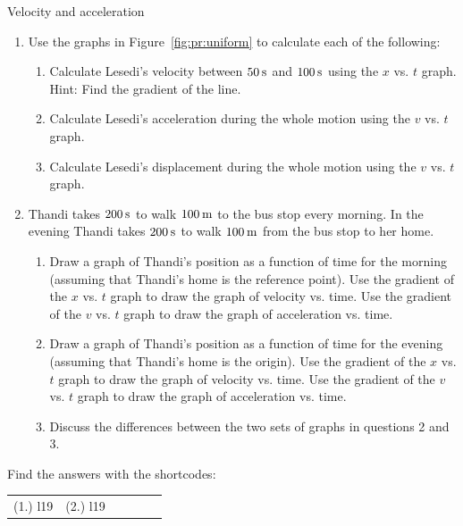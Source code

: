 \begin{exercises}{Velocity and acceleration }
            \nopagebreak \noindent
        \label{m38795*id71023}\begin{enumerate}[noitemsep, label=\textbf{\arabic*}. ] 
            \label{m38795*uid94}\item Use the graphs in Figure~\ref{fig:pr:uniform} to calculate each of the following:
\label{m38795*id71044}\begin{enumerate}[noitemsep, label=\textbf{\alph*}. ] 
            \label{m38795*uid95}\item Calculate Lesedi's velocity between $50\phantom{\rule{2pt}{0ex}}\text{s}$ and $100\phantom{\rule{2pt}{0ex}}\text{s}$ using the $x$ vs. $t$ graph. Hint: Find the gradient of the line.
\label{m38795*uid96}\item Calculate Lesedi's acceleration during the whole motion using the $v$ vs. $t$ graph.
\label{m38795*uid97}\item Calculate Lesedi's displacement during the whole motion using the $v$ vs. $t$ graph.
\end{enumerate}
                \label{m38795*uid98}\item Thandi takes $200\phantom{\rule{2pt}{0ex}}\text{s}$ to walk $100\phantom{\rule{2pt}{0ex}}\text{m}$ to the bus stop every morning. In the evening Thandi takes $200\phantom{\rule{2pt}{0ex}}\text{s}$ to walk $100\phantom{\rule{2pt}{0ex}}\text{m}$ from the bus stop to her home.\label{m38795*id7103444}\begin{enumerate}[noitemsep, label=\textbf{\alph*}. ] 
            \label{m38795*uid9523}\item  Draw a graph of Thandi's position as a function of time for the morning (assuming that Thandi's home is the reference point). Use the gradient of the $x$ vs. $t$ graph to draw the graph of velocity vs. time. Use the gradient of the $v$ vs. $t$ graph to draw the graph of acceleration vs. time.
\label{m38795*uid99}\item  Draw a graph of Thandi's position as a function of time for the evening (assuming that Thandi's home is the origin). Use the gradient of the $x$ vs. $t$ graph to draw the graph of velocity vs. time. Use the gradient of the $v$ vs. $t$ graph to draw the graph of acceleration vs. time.
\label{m38795*uid100}\item Discuss the differences between the two sets of graphs in questions 2 and 3.\end{enumerate}
        \end{enumerate}
\label{m38795*secfhsst!!!underscore!!!id2603}
\par {} Find the answers with the shortcodes:
 \par \begin{tabular}[h]{cccccc}
 (1.) l19  &  (2.) l19  & \end{tabular}
\end{exercises}
